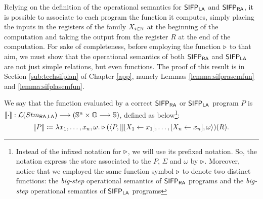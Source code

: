 Relying on the definition of the operational semantics for $\mathsf{SIFP_{{\mathsf{LA}}}}$ and $\mathsf{SIFP_{{\mathsf{RA}}}}$,
it is possible to associate to each program the function it
computes, simply placing the inputs in the registers of the family ${X_{i \in \mathbb{N}}}$ at the
beginning of the computation and taking the output from the register $R$ at
the end of the computation.
%
For sake of completeness, before employing the function $\triangleright$ to that aim,
we must show that the operational semantics of both $\mathsf{SIFP_{{\mathsf{RA}}}}$ and $\mathsf{SIFP_{{\mathsf{LA}}}}$
are not just simple relations, but even functions. The proof of this result is in
Section \ref{sub:techsifplan} of Chapter \ref{app}, namely Lemmas
\ref{lemma:sifprasemfun} and \ref{lemma:sifplasemfun}.

\begin{defn}
  \label{def:simprafuneval}
  \label{def:simplafuneval}
We say that the function evaluated by a correct $\mathsf{SIFP_{{\mathsf{RA}}}}$ or $\mathsf{SIFP_{{\mathsf{LA}}}}$ program $P$ is $\mathcal \llbracket \cdot\rrbracket: {\mathcal L ({Stm_{{\mathsf{RA}}, {\mathsf{LA}}}})} \longrightarrow (\mathbb{S}^n \times \mathbb{O} \longrightarrow \mathbb{S})$, defined as below\footnote{Instead of the infixed notation for $\triangleright$, we will use its prefixed notation. So, the notation express the store associated to the $P$, $\Sigma$ and $\omega$ by $\triangleright$. Moreover, notice that we employed the same function symbol $\triangleright$ to denote two distinct functions: the \emph{big-step} operational semantics of $\mathsf{SIFP_{{\mathsf{RA}}}}$ programs and the \emph{big-step} operational semantics of $\mathsf{SIFP_{{\mathsf{LA}}}}$ programs}:
\[
\llbracket P\rrbracket\coloneqq \lambda x_1, \ldots, x_n, \omega.\triangleright(\langle P, [][X_1 \leftarrow x_1], \ldots, [X_n \leftarrow x_n], \omega\rangle)(R).
\]
\end{defn}




%

